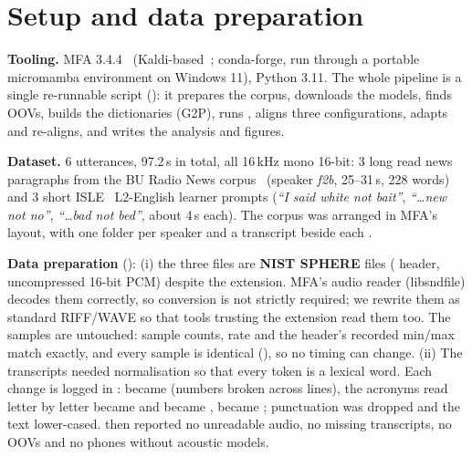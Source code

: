 \section{Setup and data preparation}
\textbf{Tooling.} MFA 3.4.4~\cite{mfa} (Kaldi-based~\cite{kaldi}; conda-forge, run through a portable micromamba environment on Windows 11), Python 3.11.
The whole pipeline is a single re-runnable script (): it prepares the corpus, downloads the models, finds OOVs,
builds the dictionaries (G2P), runs , aligns three configurations, adapts and re-aligns, and writes the analysis and figures.

\textbf{Dataset.} 6 utterances, 97.2\,s in total, all 16\,kHz mono 16-bit:
3 long read news paragraphs from the BU Radio News corpus~\cite{buradio} (speaker \textit{f2b}, 25--31\,s, 228 words) and
3 short ISLE~\cite{isle} L2-English learner prompts (\textit{``I said white not bait''}, \textit{``\dots new not no''}, \textit{``\dots bad not bed''}, about 4\,s each).
The corpus was arranged in MFA's layout, with one folder per speaker and a  transcript beside each .

\textbf{Data preparation} ():
(i) the three  files are \textbf{NIST SPHERE} files ( header, uncompressed 16-bit PCM) despite the  extension.
MFA's audio reader (libsndfile) decodes them correctly, so conversion is not strictly required; we rewrite them as standard RIFF/WAVE so that tools trusting the extension read them too.
The samples are untouched: sample counts, rate and the header's recorded min/max match exactly, and every sample is identical (), so no timing can change.
(ii) The transcripts needed normalisation so that every token is a lexical word. Each change is logged in :
 became  (numbers broken across lines), the acronyms read letter by letter
 became  and  became ,  became ; punctuation was dropped and the text lower-cased.
 then reported no unreadable audio, no missing transcripts, no OOVs and no phones without acoustic models.

